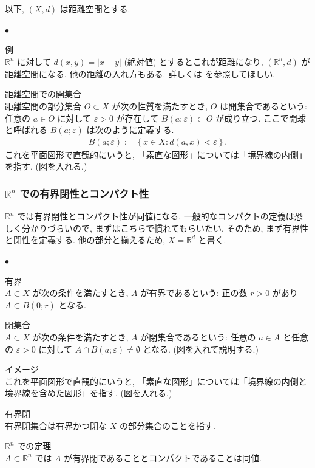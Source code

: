 \documentclass[openany, a4paper, oneside]{book}
\newcounter{enum2}
\renewenvironment{itemize}{%
\begin{list}{$\bullet$\ \ }%
{%
\usecounter{enum2}
\setlength{\itemindent}{0pt}%
\setlength{\leftmargin}{6pt}%
\setlength{\rightmargin}{0pt}%
\setlength{\labelsep}{0pt}%
\setlength{\labelwidth}{6pt}%
\setlength{\itemsep}{0pt}%
\setlength{\parsep}{0pt}%
\setlength{\listparindent}{0pt}%
}
}{%
\end{list}%
}
\theoremstyle{break}
\theoremstyle{breakdefn}
\begin{document}
以下, $(X, d)$ は距離空間とする.
\begin{itemize}

\item 例\\
\label{sec-11-3-17-4-1-1}%
$\mathbb{R}^n$ に対して $d (x, y) = \left| x - y \right|$ (絶対値) とするとこれが距離になり,
$(\mathbb{R}^n, d)$ が距離空間になる.
他の距離の入れ方もある.
詳しくは \cite{ShigeoIchiraku1, KazuoMatsuzaka1} を参照してほしい.

\item 距離空間での開集合\\
\label{sec-11-3-17-4-1-2}%
距離空間の部分集合 $O \subset X$ が次の性質を満たすとき, $O$ は開集合であるという:
任意の $a \in O$ に対して $\varepsilon > 0$ が存在して $B (a; \varepsilon) \subset O$ が成り立つ.
ここで開球と呼ばれる $B (a; \varepsilon)$ は次のように定義する.
\begin{align}
 B (a; \varepsilon)
 :=
 \left\{ x \in X : d (a, x) < \varepsilon \right\}.
\end{align}
これを平面図形で直観的にいうと, 「素直な図形」については「境界線の内側」を指す.
(図を入れる.)
\end{itemize} %
\subsubsection{$\mathbb{R}^n$ での有界閉性とコンパクト性}
\label{sec-11-3-17-4-2}

$\mathbb{R}^n$ では有界閉性とコンパクト性が同値になる.
一般的なコンパクトの定義は恐しく分かりづらいので, まずはこちらで慣れてもらいたい.
そのため, まず有界性と閉性を定義する.
他の部分と揃えるため, $X = \mathbb{R}^d$ と書く.
\begin{itemize}

\item 有界\\
\label{sec-11-3-17-4-2-1}%
$A \subset X$ が次の条件を満たすとき, $A$ が有界であるという:
正の数 $r > 0$ があり $A \subset B (0; r)$ となる.

\item 閉集合\\
\label{sec-11-3-17-4-2-2}%
$A \subset X$ が次の条件を満たすとき, $A$ が閉集合であるという:
任意の $a \in A$ と任意の $\varepsilon > 0$ に対して $A \cap B (a; \varepsilon) \neq \emptyset$ となる.
(図を入れて説明する.)

\item イメージ\\
\label{sec-11-3-17-4-2-3}%
これを平面図形で直観的にいうと, 「素直な図形」については「境界線の内側と境界線を含めた図形」を指す.
(図を入れる.)

\item 有界閉\\
\label{sec-11-3-17-4-2-4}%
有界閉集合は有界かつ閉な $X$ の部分集合のことを指す.

\item $\mathbb{R}^n$ での定理\\
\label{sec-11-3-17-4-2-5}%
$A \subset \mathbb{R}^n$ では $A$ が有界閉であることとコンパクトであることは同値.
\end{itemize} %
\end{document}
